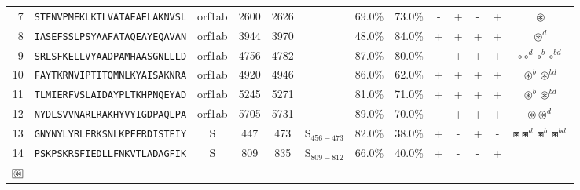 \begin{tabular}{rcccccccccccc}
7  &  \texttt{STFNVPMEKLKTLVATAEAELAKNVSL} &  orf1ab &   2600 &  2626 &                &                          69.0\% &                           73.0\% &          - &           + &          - &           + &                                                                                                     $ \circledast $ \\
8  &  \texttt{IASEFSSLPSYAAFATAQEAYEQAVAN} &  orf1ab &   3944 &  3970 &                &                          48.0\% &                           84.0\% &          + &           + &          + &           + &                                                                                                   $ \circledast^d $ \\
9  &  \texttt{SRLSFKELLVYAADPAMHAASGNLLLD} &  orf1ab &   4756 &  4782 &                &                          87.0\% &                           80.0\% &          - &           + &          + &           + &                                                                                $ \circ \circ^d \circ^b \circ^{bd} $ \\
10 &  \texttt{FAYTKRNVIPTITQMNLKYAISAKNRA} &  orf1ab &   4920 &  4946 &                &                          86.0\% &                           62.0\% &          + &           + &          + &           + &                                                                                  $ \circledast^b \circledast^{bd} $ \\
11 &  \texttt{TLMIERFVSLAIDAYPLTKHPNQEYAD} &  orf1ab &   5245 &  5271 &                &                          81.0\% &                           71.0\% &          + &           + &          + &           + &                                                                                  $ \circledast^b \circledast^{bd} $ \\
12 &  \texttt{NYDLSVVNARLRAKHYVYIGDPAQLPA} &  orf1ab &   5705 &  5731 &                &                          89.0\% &                           70.0\% &          - &           + &          + &           + &                                                                                       $ \circledast \circledast^d $ \\
13 &  \texttt{GNYNYLYRLFRKSNLKPFERDISTEIY} &       S &    447 &   473 &  S$_{456-473}$ &                          82.0\% &                           38.0\% &          + &           - &          + &           - &                                                                        $ \boxast \boxast^d \boxast^b \boxast^{bd} $ \\
14 &  \texttt{PSKPSKRSFIEDLLFNKVTLADAGFIK} &       S &    809 &   835 &  S$_{809-812}$ &                          66.0\% &                           40.0\% &          + &           - &          - &           + &  \Centerstack{  $\boxast \boxast^b \boxcircle \boxcircle^d$ \\  $\setlength{\fboxsep}{0.5pt} \boxed{\circledast}$ } \\
\bottomrule
\end{tabular}
